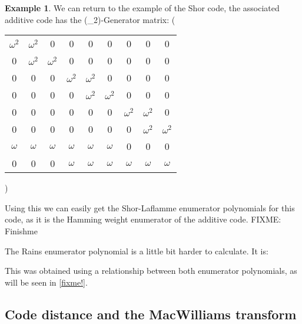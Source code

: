 \documentclass{article}
\def\F{\mathbb{F}}
\theoremstyle{definition}
\newtheorem{ex}[Satz]{Example}
\begin{document}
\begin{ex}
We can return to the example of the Shor code, the associated additive code has the (\F_2)-Generator matrix:
\left( \begin{tabular}{ccccccccc}
$\omega^ 2$ & $\omega^ 2$ & 0 & 0 & 0 & 0 & 0 & 0 & 0 \\ 
0 & $\omega^ 2$ & $\omega^ 2$ & 0 & 0 & 0 & 0 & 0 & 0 \\
0 & 0 & 0 & $\omega^ 2$ & $\omega^ 2$ & 0 & 0 & 0 & 0 \\
0 & 0 & 0 & 0 & $\omega^ 2$ & $\omega^ 2$&  0 & 0 & 0 \\
0 & 0 & 0 & 0 & 0 & 0 & $\omega^ 2$ & $\omega^ 2$ & 0 \\
0 & 0 & 0 & 0 & 0 & 0 & 0 & $\omega^ 2$ & $\omega^ 2$ \\
$\omega$ & $\omega$ & $\omega$ & $\omega$ & $\omega$ & $\omega$ & 0 & 0 & 0 \\
0 & 0 & 0 & $\omega$ & $\omega$ & $\omega$ & $\omega$ & $\omega$ & $\omega$ \\
\end{tabular} \right)

Using this we can easily get the Shor-Laflamme enumerator polynomials for this code, as it is the Hamming weight enumerator 
of the additive code. FIXME: Finishme


The Rains enumerator polynomial is a little bit harder to calculate. It is:

This was obtained using a relationship between both enumerator polynomials, as will be seen in \ref{fixme!}.
\end{ex}

\subsection{Code distance and the MacWilliams transform}
\end{document}
